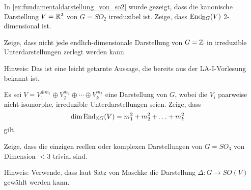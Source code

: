 \begin{sheet}

\begin{problem}[title={Satz von Schur über Körpern $\neq\IC$}]
In \ref{ex:fundamentaldarstellung_von_so2} wurde gezeigt, dass die kanonische Darstellung $V=\mathbb{R}^2$ von $G=SO_2$ irreduzibel ist. Zeige, dass $\operatorname{End}_{\mathbb{R} G}(V)$ 2-dimensional ist.
\end{problem}

\begin{problem}[title={Der Satz von Maschke ist falsch für nichtkompakte Gruppen}, difficulty={leichter als es aussieht}]
Zeige, dass nicht jede endlich-dimensionale Darstellung von $G=\mathbb{Z}$ in irreduzible Unterdarstellungen zerlegt werden kann.

Hinweis: Das ist eine leicht getarnte Aussage, die bereits aus der LA-I-Vorlesung bekannt ist.
\end{problem}


\begin{problem}
Es sei $V = V_1^{\oplus m_1} \oplus V_2^{m_2} \oplus \cdots \oplus V_k^{m_k}$ eine Darstellung von $G$, wobei die $V_i$ paarweise nicht-isomorphe, irreduzible Unterdarstellungen seien. Zeige, dass
\[\dim \operatorname{End}_{\mathbb{K} G}(V) = m_1^2 + m_2^2 + \ldots + m_k^2\]
gilt.
\end{problem}

\begin{problem}\label{ex:keine_2D_darstellung_von_so3}
Zeige, dass die einzigen reellen oder komplexen Darstellungen von $G=SO_3$ von Dimension $<3$ trivial sind.

Hinweis: Verwende, dass laut Satz von Maschke die Darstellung $\Delta: G\to SO(V)$ gewählt werden kann.
\end{problem}

\end{sheet}